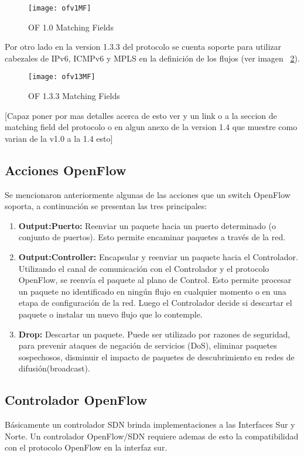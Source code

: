 \begin{figure}[htbp!] 
\centering    
\texttt{[image: ofv1MF]}
\caption[OF 1.0 Matching Fields]{OF 1.0 Matching Fields}
\label{fig:OF10MatchingFields}
\end{figure}

Por otro lado en la version 1.3.3 del protocolo se cuenta soporte para utilizar cabezales de IPv6, ICMPv6 y MPLS en la definición de los flujos (ver imagen ~\ref{fig:OF13MatchingFields}).
 
\begin{figure}[htbp!] 
\centering    
\texttt{[image: ofv13MF]}
\caption[OF 1.3.3 Matching Fields]{OF 1.3.3 Matching Fields}
\label{fig:OF13MatchingFields}
\end{figure}

[Capaz poner por mas detalles acerca de esto ver y un link o a la seccion de matching field del protocolo o en algun anexo de la version 1.4 que muestre como varian de la v1.0 a la 1.4 esto]

\subsection{Acciones OpenFlow}
Se mencionaron anteriormente algunas de las acciones que un switch OpenFlow soporta, a continuación se presentan las tres principales:

\begin{enumerate}
\item \textbf{Output:Puerto:} Reenviar un paquete hacia un puerto determinado (o conjunto de puertos). Esto permite encaminar paquetes a través de la red.
\item \textbf{Output:Controller:} Encapsular y reenviar un paquete hacia el Controlador. Utilizando el canal de comunicación con el Controlador y el protocolo OpenFlow, se reenvía el paquete al plano de Control. Esto permite procesar un paquete no identificado en ningún flujo en cualquier momento o en una etapa de configuración de la red. Luego el Controlador decide si descartar el paquete o instalar un nuevo flujo que lo contemple.
\item \textbf{Drop:} Descartar un paquete. Puede ser utilizado por razones de seguridad, para prevenir ataques de negación de servicios (DoS), eliminar paquetes sospechosos, disminuir el impacto de paquetes de descubrimiento en redes de difusión(broadcast).
\end{enumerate}

\subsection{Controlador OpenFlow}
Básicamente un controlador SDN brinda implementaciones a las Interfaces Sur y Norte. Un controlador OpenFlow/SDN requiere ademas de esto la compatibilidad con el protocolo OpenFlow en la interfaz sur. 

